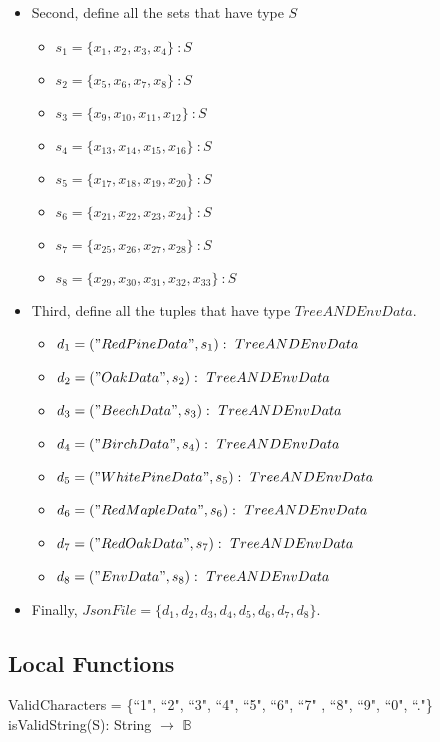 \documentclass[12pt, titlepage]{article}
\begin{document}
\begin{itemize}
    \item
Second, define all the sets that have type $S$
\begin{itemize}
    \item $s_1 = \{x_1, x_2, x_3, x_4\}\ :S$
    \item $s_2 = \{x_5, x_6, x_7, x_8\}\ :S$
    \item $s_3 = \{x_9, x_{10}, x_{11}, x_{12}\}\ :S$
    \item $s_4 = \{x_{13}, x_{14}, x_{15}, x_{16}\}\ :S$
    \item $s_5 = \{x_{17}, x_{18}, x_{19}, x_{20}\}\ :S$
    \item $s_6 = \{x_{21}, x_{22}, x_{23}, x_{24}\}\ :S$
    \item $s_7 = \{x_{25}, x_{26}, x_{27}, x_{28}\}\ :S$
    \item $s_8 = \{x_{29}, x_{30}, x_{31}, x_{32}, x_{33}\}\ :S$
\end{itemize}
    \newpage
    \item
Third, define all the tuples that have type $TreeANDEnvData$.
\begin{itemize}
    \item $d_1 = ("RedPineData", s_1):\ TreeANDEnvData$
    \item $d_2 = ("OakData", s_2):\ TreeANDEnvData$
    \item $d_3 = ("BeechData", s_3):\ TreeANDEnvData$
    \item $d_4 = ("BirchData", s_4):\ TreeANDEnvData$
    \item $d_5 = ("WhitePineData", s_5):\ TreeANDEnvData$
    \item $d_6 = ("RedMapleData", s_6):\ TreeANDEnvData$
    \item $d_7 = ("RedOakData", s_7):\ TreeANDEnvData$
    \item $d_8 = ("EnvData", s_8):\ TreeANDEnvData$
\end{itemize}
    \item
    Finally, $JsonFile = \{d_1, d_2, d_3, d_4, d_5, d_6,
    d_7, d_8\}.$
\end{itemize}

\subsection{Local Functions}
ValidCharacters = \{``1", ``2", ``3", ``4", ``5", ``6", ``7"
, ``8", ``9", ``0", ``."\}\\

\noindent isValidString(S): String $\rightarrow$ $\mathbb{B}$ \\
\end{document}
